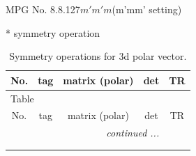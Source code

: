 \documentclass[fleqn,8pt]{jsarticle}
\begin{document}
\setcounter{MaxMatrixCols}{32}

\renewcommand{\tablename}{Table~}
\renewcommand{\figurename}{Figure~}
\begin{center}
\LARGE
MPG No. 8.8.127\quad$m'm'm$\quad(m'mm' setting)
\end{center}
* symmetry operation
\renewcommand{\arraystretch}{1.3}
\begin{longtable}{ccccc}
\caption{Symmetry operations for 3d polar vector.}
 \\
 \hline \hline
No. & tag & matrix (polar) & det & TR \\ \hline \endfirsthead

\multicolumn{4}{l}{\tablename\ \thetable{}} \\
 \hline \hline
No. & tag & matrix (polar) & det & TR \\ \hline \endhead

 \hline \hline
\multicolumn{4}{r}{\footnotesize\it continued ...} \\ \endfoot

 \hline \hline
\multicolumn{4}{r}{} \\ \endlastfoot


\end{longtable}
\end{document}
